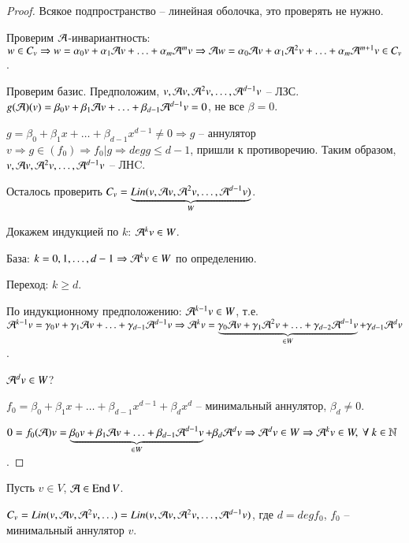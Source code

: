 \documentclass[main]{subfiles}
\begin{document}
\begin{proof}
    Всякое подпространство -- линейная оболочка, это проверять не нужно.

    Проверим $\mathcal{A}$-инвариантность: $w \in C_v \Rightarrow w = \alpha_0 v + \alpha_1 \mathcal{A} v + \ldots + \alpha_m {\mathcal{A}}^{m} v \Rightarrow
        \mathcal{A} w = \alpha_0 \mathcal{A} v + \alpha_1 {\mathcal{A}}^2 v + \ldots + \alpha_m {\mathcal{A}}^{m+1} v \in C_v$.

     Проверим базис. Предположим, $v, \mathcal{A} v, {\mathcal{A}}^2 v, \ldots, {\mathcal{A}}^{d-1} v$ -- ЛЗС. $g(\mathcal{A})(v) = \beta_0 v + \beta_1 \mathcal{A} v + \ldots + \beta_{d-1} {\mathcal{A}}^{d-1} v = 0$, не все $\beta = 0$.

    $g = \beta_0 + \beta_1 x + \ldots + \beta_{d-1} x^{d-1} \neq 0 \Rightarrow
        g$ -- аннулятор $v \Rightarrow g \in (f_0) \Rightarrow f_0|g \Rightarrow deg g \leq d-1$, пришли к противоречию.
    Таким образом, $v, \mathcal{A} v, {\mathcal{A}}^2 v, \ldots, {\mathcal{A}}^{d-1} v$ -- ЛНC.

    Осталось проверить $C_v = \underbrace{Lin(v, \mathcal{A} v, {\mathcal{A}}^2 v, \ldots, {\mathcal{A}}^{d-1} v)}_{W}$.

    Докажем индукцией по $k$: ${\mathcal{A}}^{k} v \in W$.

    База: $k = 0, 1, \ldots, d-1 \Rightarrow {\mathcal{A}}^k v  \in W$ по определению.

    Переход: $k\geq d$.

    По индукционному предположению: ${\mathcal{A}}^{k-1} v \in W$,
    т.е. ${\mathcal{A}}^{k-1}v = \gamma_0 v + \gamma_1 \mathcal{A} v + \ldots + \gamma_{d-1} {\mathcal{A}}^{d-1} v \Rightarrow
        {\mathcal{A}}^k v = \underbrace{\gamma_0 \mathcal{A} v + \gamma_1 {\mathcal{A}}^2 v + \ldots + \gamma_{d-2} {\mathcal{A}}^{d-1} v}_{\in W} + \gamma_{d-1} {\mathcal{A}}^d v$.

    ${\mathcal{A}}^d v \in W$?

    $f_0 = \beta_0 + \beta_1 x + \ldots + \beta_{d-1} x^{d-1} + \beta_d x^d$ -- минимальный аннулятор, $\beta_d \neq 0$.

    $0 = f_0(\mathcal{A}) v = \underbrace{\beta_0 v +\beta_1 \mathcal{A} v + \ldots + \beta_{d-1} {\mathcal{A}}^{d-1} v}_{\in W} + \beta_d {\mathcal{A}}^d v \Rightarrow {\mathcal{A}}^d v \in W \Rightarrow
        {\mathcal{A}}^k v \in W, \  \forall \ k \in \mathbb{N}$.

\end{proof}


Пусть $v \in V$, $\mathcal{A} \in \operatorname{End} V$.

$C_v = Lin(v, \mathcal{A} v, {\mathcal{A}}^2 v, \ldots) = Lin(v, \mathcal{A} v, {\mathcal{A}}^2 v, \ldots, {\mathcal{A}}^{d-1} v)$, где $d = deg f_0$, $f_0$ -- минимальный аннулятор $v$.
\end{document}
